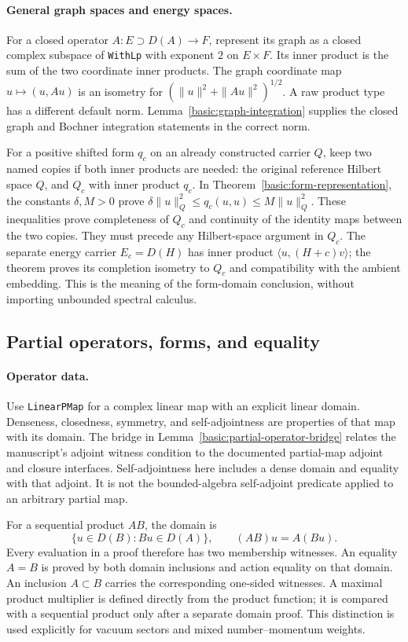 \documentclass[11pt,a4paper]{article}
\theoremstyle{definition}
\theoremstyle{remark}
\begin{document}
\paragraph{General graph spaces and energy spaces.}
For a closed operator $A:E\supset D(A)\to F$, represent its graph
as a closed complex subspace of \nolinkurl{WithLp} with exponent
$2$ on $E\times F$. Its inner product is the sum of the two
coordinate inner products. The graph coordinate map
$u\mapsto(u,Au)$ is an isometry for
$(\|u\|^2+\|Au\|^2)^{1/2}$. A raw product type has a different
default norm. Lemma~\ref{basic:graph-integration} supplies the
closed graph and Bochner integration statements in the correct norm.

For a positive shifted form $q_c$ on an already constructed carrier
$Q$, keep two named copies if both inner products are needed:
the original reference Hilbert space $Q$, and $Q_c$ with inner
product $q_c$. In Theorem~\ref{basic:form-representation}, the
constants $\delta,M>0$ prove
$\delta\|u\|_Q^2\leq q_c(u,u)\leq M\|u\|_Q^2$.
These inequalities prove completeness of $Q_c$ and continuity of
the identity maps between the two copies. They must precede any
Hilbert-space argument in $Q_c$. The separate energy carrier
$E_c=D(H)$ has inner product $\langle u,(H+c)v\rangle$;
the theorem proves its completion isometry to $Q_c$ and compatibility
with the ambient embedding. This is the meaning of the form-domain
conclusion, without importing unbounded spectral calculus.

\subsection{Partial operators, forms, and equality}

\paragraph{Operator data.}
Use \nolinkurl{LinearPMap} for a complex linear map with an explicit
linear domain. Denseness, closedness, symmetry, and self-adjointness
are properties of that map with its domain. The bridge in
Lemma~\ref{basic:partial-operator-bridge} relates the manuscript's
adjoint witness condition to the documented partial-map adjoint and
closure interfaces. Self-adjointness here includes a dense domain
and equality with that adjoint. It is not the bounded-algebra
self-adjoint predicate applied to an arbitrary partial map.

For a sequential product $AB$, the domain is
\[
 \{u\in D(B):Bu\in D(A)\},\qquad (AB)u=A(Bu).
\]
Every evaluation in a proof therefore has two membership witnesses.
An equality $A=B$ is proved by both domain inclusions and action
equality on that domain. An inclusion $A\subset B$ carries the
corresponding one-sided witnesses. A maximal product multiplier is
defined directly from the product function; it is compared with a
sequential product only after a separate domain proof. This distinction
is used explicitly for vacuum sectors and mixed number--momentum
weights.
\end{document}
